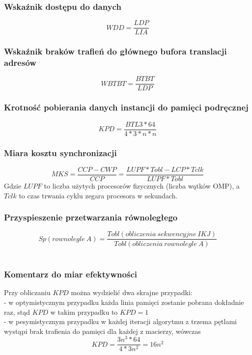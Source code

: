 \documentclass[10pt,a4paper]{article}
\begin{document}
\subsubsection*{Wskaźnik dostępu do danych}
\begin{equation}
	WDD = \frac{LDP}{LIA}
\end{equation}
\subsubsection*{Wskaźnik braków trafień do głównego bufora translacji adresów}
\begin{equation}
	WBTBT = \frac{BTBT}{LDP}
\end{equation}
\subsubsection*{Krotność pobierania danych instancji do pamięci podręcznej}
\begin{equation}
	KPD = \frac{BTL3 * 64}{4 * 3 * n * n}
\end{equation}
\subsubsection*{Miara kosztu synchronizacji}
\begin{equation}
	MKS = \frac{CCP - CWP}{CCP} = \frac{LUPF * Tobl - LCP * Tclk}{LUPF * Tobl}
\end{equation}
Gdzie $LUPF$ to liczba użytych procesorów fizycznych (liczba wątków OMP), a $Tclk$ 
to czas trwania cyklu zegara procesora w sekundach.
\subsubsection*{Przyspieszenie przetwarzania równoległego}
\begin{equation}
	Sp(rownolegle\: A) = \frac{Tobl(obliczenia \: sekwencyjne \: IKJ)}{Tobl(obliczenia \: rownolegle \: A)}
\end{equation}
\\
\subsubsection*{Komentarz do miar efektywności}
Przy obliczaniu $KPD$ można wydzielić dwa skrajne przypadki: \\
- w optymistycznym przypadku każda linia pamięci zostanie pobrana dokładnie raz,
stąd $KPD$ w takim przypadku to $KPD = 1$\\
- w pesymistycznym przypadku w każdej iteracji algorytmu z trzema pętlami wystąpi
brak trafienia do pamięci dla każdej z macierzy, wówczas $$KPD = \frac{3n^3 * 64}{4 * 3n^2}
= 16 n^2$$
\end{document}
